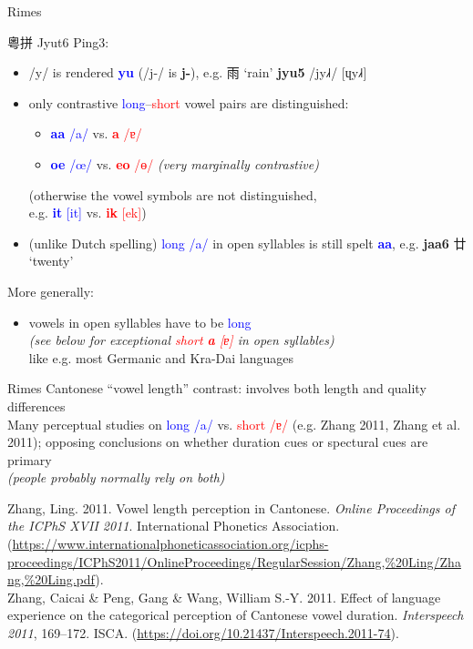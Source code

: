 \documentclass{beamer}
\begin{document}
\begin{frame}[fragile]{Rimes}

粵拼 Jyut6 Ping3:
\begin{itemize}
    \item /y/ is rendered \textcolor{blue}{\textbf{yu}} (/j-/ is \textbf{j-}), e.g. 雨 \enquote*{rain} \textbf{jyu5} /jy˩˧/ [ɥy˩˧] 
    \item only contrastive \textcolor{blue}{long}–\textcolor{red}{short} vowel pairs are distinguished:
        \begin{itemize}
            \item \textcolor{blue}{\textbf{aa} /a/} vs. \textcolor{red}{\textbf{a} /ɐ/}
            \item \textcolor{blue}{\textbf{oe} /œ/} vs. \textcolor{red}{\textbf{eo} /ɵ/} {\scriptsize \emph{(very marginally contrastive)}}
        \end{itemize}
        (otherwise the vowel symbols are not distinguished,\\ e.g. \textcolor{blue}{\textbf{it} [it]} vs. \textcolor{red}{\textbf{ik} [ek]})
    \item (unlike Dutch spelling) \textcolor{blue}{long /a/} in open syllables is still spelt \textcolor{blue}{\textbf{aa}}, e.g. \textbf{jaa6} 廿 \enquote*{twenty} 
\end{itemize}
More generally:
\begin{itemize}
    \item vowels in open syllables have to be \textcolor{blue}{long}\\
    \quad \emph{\scriptsize (see below for exceptional \textcolor{red}{short \textbf{a} [ɐ]} in open syllables)}\\
    like e.g. most Germanic and Kra-Dai languages\\
\end{itemize}

\end{frame}

\begin{frame}[fragile]{Rimes}
Cantonese \enquote{vowel length} contrast: involves both length and quality differences\\ \medskip
Many perceptual studies on \textcolor{blue}{long /a/} vs. \textcolor{red}{short /ɐ/} (e.g. Zhang 2011, Zhang et al. 2011); opposing conclusions on whether duration cues or spectural cues are primary \\ 
\quad \emph{(people probably normally rely on both)}

\vfill{\tiny {} Zhang, Ling. 2011. Vowel length perception in Cantonese. \emph{Online Proceedings of the ICPhS XVII 2011}. International Phonetics Association. (\url{https://www.internationalphoneticassociation.org/icphs-proceedings/ICPhS2011/OnlineProceedings/RegularSession/Zhang,%20Ling/Zhang,%20Ling.pdf}).\\ \smallskip
Zhang, Caicai \& Peng, Gang \& Wang, William S.-Y. 2011. Effect of language experience on the categorical perception of Cantonese vowel duration. \emph{Interspeech 2011}, 169–172. ISCA. (\url{https://doi.org/10.21437/Interspeech.2011-74}).\\}

\end{frame}
\end{document}
